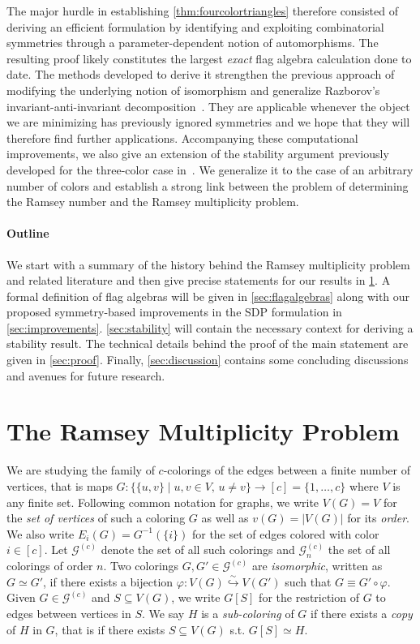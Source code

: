 \documentclass[a4paper,11pt]{article}
\numberwithin{equation}{section}
\newcommand{\mG}{\mathcal{G}}
\begin{document}
The major hurdle in establishing \cref{thm:fourcolortriangles} therefore consisted of deriving an efficient formulation by identifying and exploiting combinatorial symmetries through a parameter-dependent notion of automorphisms. The resulting proof likely constitutes the largest \emph{exact} flag algebra calculation done to date. The methods developed to derive it strengthen the previous approach of modifying the underlying notion of isomorphism and generalize Razborov's invariant-anti-invariant decomposition~\cite{Razborov_2010}. They are applicable whenever the object we are minimizing has previously ignored symmetries and we hope that they will therefore find further applications. Accompanying these computational improvements, we also give an extension of the  stability argument previously developed for the three-color case in~\cite{CummingsEtAl_2013}. We generalize it to the case of an arbitrary number of colors and establish a strong link between the problem of determining the Ramsey number and the Ramsey multiplicity problem.

\paragraph{Outline} We start with a summary of the history behind the Ramsey multiplicity problem and related literature and then give precise statements for our results in \cref{sec:background}.  A formal definition of flag algebras will be given in \cref{sec:flagalgebras} along with our proposed symmetry-based improvements in the SDP formulation in \cref{sec:improvements}. \cref{sec:stability} will contain the necessary context for deriving a stability result. The technical details behind the proof of the main statement are given in \cref{sec:proof}. Finally, \cref{sec:discussion} contains some concluding discussions and avenues for future research.

\section{The Ramsey Multiplicity Problem}\label{sec:background}


We are studying the family of $c$-colorings of the edges between a finite number of vertices, that is maps $G: \big\{ \{u, v\} \mid u,v \in V, \,  u \neq v \big\} \to [c] = \{1, \ldots, c\}$ where $V$ is any finite set. Following common notation for graphs, we write $V(G) = V$ for the \emph{set of vertices} of such a coloring $G$ as well as $v(G) = |V(G)|$ for its \emph{order}. We also write $E_i(G) = G^{-1} (\{i\})$ for the set of edges colored with color $i \in [c]$. Let $\mG^{(c)}$ denote the set of all such colorings and $\mG_n^{(c)}$ the set of all colorings of order $n$. Two colorings $G, G' \in \mG^{(c)}$ are \emph{isomorphic}, written as $G \simeq G'$, if there exists a bijection $\varphi: V(G) \overset{\sim}{\hookrightarrow} V(G')$ such that $G \equiv G' \circ \varphi$. Given $G \in \mG^{(c)}$ and $S \subseteq V(G)$, we write $G[S]$ for the restriction of $G$ to edges between vertices in $S$. We say $H$ is a \emph{sub-coloring} of $G$ if there exists a \emph{copy} of $H$ in $G$, that is if there exists $S \subseteq V(G)$ s.t. $G[S] \simeq H$.
\end{document}
